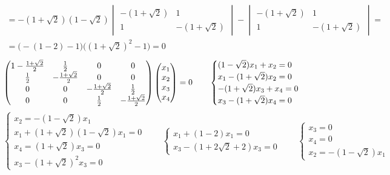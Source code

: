 \begin{itemize}
\begin{multline*}
        = -(1 + \sqrt2)(1 - \sqrt2)
        \begin{vmatrix}
        	-(1 + \sqrt2) & 1 \\
            1 & -(1 + \sqrt2)
        \end{vmatrix} -
        \begin{vmatrix}
        	-(1 + \sqrt2) & 1 \\
            1 & -(1 + \sqrt2)
        \end{vmatrix} = \\
        = \bigg( -(1 - 2) - 1 \bigg) \bigg( (1 + \sqrt2)^2 - 1 \bigg) = 0
    \end{multline*}
    $$
    \begin{pmatrix}
    	1 - \half[1 + \sqrt{2}] & \half & 0 & 0 \\
        \half & -\half[1 + \sqrt{2}] & 0 & 0 \\
        0 & 0 & -\half[1 + \sqrt{2}] & \half \\
        0 & 0 & \half & -\half[1 + \sqrt{2}]
    \end{pmatrix}
    \begin{pmatrix}
    	x_1 \\
        x_2 \\
        x_3 \\
        x_4
    \end{pmatrix} = 0 \qquad
    \begin{cases}
    	(1 - \sqrt2)x_1 + x_2 = 0 \\
        x_1 - (1 + \sqrt2)x_2 = 0 \\
        -(1 + \sqrt2)x_3 + x_4 = 0 \\
        x_3 - (1 + \sqrt2)x_4 = 0
    \end{cases} $$
    $$
    \begin{cases}
    	x_2 = -(1 - \sqrt2)x_1 \\
        x_1 + (1 + \sqrt2)(1 - \sqrt2)x_1 = 0 \\
        x_4 = (1 + \sqrt2)x_3 = 0 \\
        x_3 - (1 + \sqrt2)^2x_3 = 0
    \end{cases} \qquad
    \begin{cases}
    	x_1 + (1 - 2)x_1 = 0 \\
        x_3 - (1 + 2\sqrt2 + 2)x_3 = 0
    \end{cases} \qquad
    \begin{cases}
    	x_3 = 0 \\
        x_4 = 0 \\
        x_2 = -(1 - \sqrt2)x_1

\end{cases}$$
\end{itemize}
